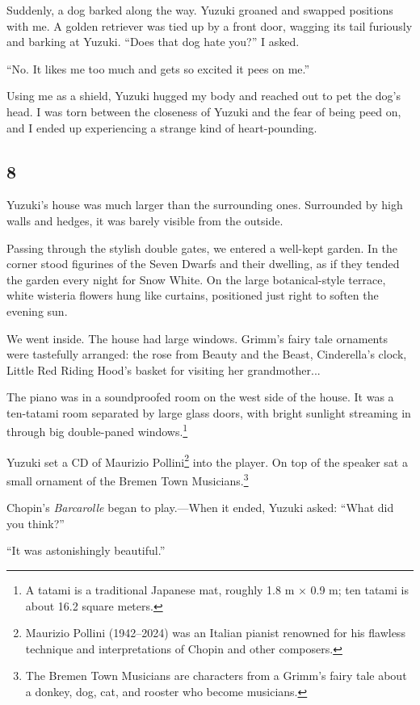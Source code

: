 \documentclass[
    a4paper,
    12pt,
    twoside,
    openany,
    UTF8,
    fontset=windows
]{ctexbook}
\begin{document}
Suddenly, a dog barked along the way. Yuzuki groaned and swapped positions with me. A golden retriever was tied up by a front door, wagging its tail furiously and barking at Yuzuki. ``Does that dog hate you?'' I asked.

``No. It likes me too much and gets so excited it pees on me.''

Using me as a shield, Yuzuki hugged my body and reached out to pet the dog's head. I was torn between the closeness of Yuzuki and the fear of being peed on, and I ended up experiencing a strange kind of heart-pounding.


\subsection*{8}

Yuzuki's house was much larger than the surrounding ones. Surrounded by high walls and hedges, it was barely visible from the outside.

Passing through the stylish double gates, we entered a well-kept garden. In the corner stood figurines of the Seven Dwarfs and their dwelling, as if they tended the garden every night for Snow White. On the large botanical-style terrace, white wisteria flowers hung like curtains, positioned just right to soften the evening sun.

We went inside. The house had large windows. Grimm's fairy tale ornaments were tastefully arranged: the rose from Beauty and the Beast, Cinderella's clock, Little Red Riding Hood's basket for visiting her grandmother...

The piano was in a soundproofed room on the west side of the house. It was a ten-tatami room separated by large glass doors, with bright sunlight streaming in through big double-paned windows.\footnote{A tatami is a traditional Japanese mat, roughly 1.8 m × 0.9 m; ten tatami is about 16.2 square meters.}

Yuzuki set a CD of Maurizio Pollini\footnote{Maurizio Pollini (1942–2024) was an Italian pianist renowned for his flawless technique and interpretations of Chopin and other composers.} into the player. On top of the speaker sat a small ornament of the Bremen Town Musicians.\footnote{The Bremen Town Musicians are characters from a Grimm's fairy tale about a donkey, dog, cat, and rooster who become musicians.}

Chopin's \textit{Barcarolle} began to play.---When it ended, Yuzuki asked: ``What did you think?''

``It was astonishingly beautiful.''
\end{document}
